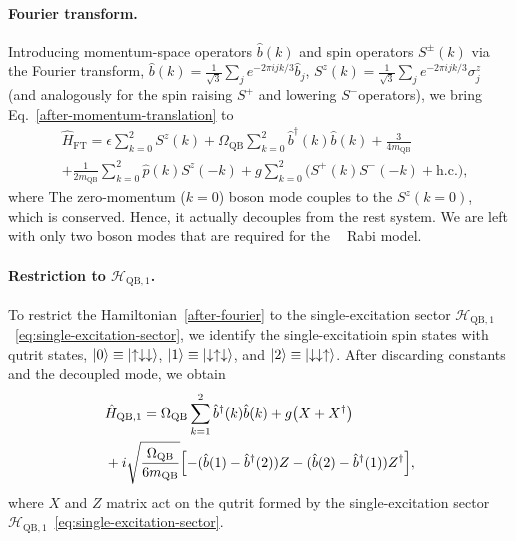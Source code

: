 \documentclass[reprint, aps, prx, amsmath, amssymb, longbibliography, superscriptaddress]{revtex4-2}
\DeclareMathOperator{\Zthree}{\mathbb{Z}_3}
\begin{document}
\paragraph{Fourier transform.}
Introducing momentum-space operators $\hat b(k)$ and spin operators $S^{\pm}(k)$ via the Fourier transform, $\hat b(k)= \tfrac{1}{\sqrt{3}}\sum_{j}e^{-2\pi i jk/3}\hat b_j$, $ S^z(k)= \tfrac{1}{\sqrt{3}}\sum_{j}e^{-2\pi i jk/3}\sigma_j^z$ (and analogously for the spin raising $S^+$ and lowering $S^-$operators), we
bring Eq.~\eqref{after-momentum-translation} to
\begin{equation}
\label{after-fourier}
  \begin{aligned}
    &\hat H_{\text{FT}} = \epsilon \sum_{k=0}^{2} S^{z}(k)
      + \Omega_{\text{QB}} \sum_{k=0}^{2} \hat b^{\dagger}(k) \hat b(k)
                         + \frac{3}{4 m_{\text{QB}}} \\
     &+\frac{1}{2 m_{\text{QB}}} \sum_{k=0}^{2} \hat p(k) S^{z}(-k)
            + g \sum_{k=0}^{2} \bigl( S^{+}(k) S^{-}(-k) + \text{h.c.} \bigr),
  \end{aligned}
\end{equation}
where The zero-momentum ($k=0$) boson mode
couples to the $S^z(k=0)$, which is conserved. Hence, it actually decouples from the rest system. We are left with only two boson modes that are required for the $\Zthree$ Rabi model.

\paragraph{Restriction to $\mathcal H_{\text{QB},1}$.}
To restrict the Hamiltonian~\eqref{after-fourier} to the single-excitation sector $\mathcal{H}_{\text{QB},1}$~\eqref{eq:single-excitation-sector}, we identify the single-excitatioin spin states with qutrit states, $\ket{0} \equiv \ket{\uparrow\downarrow\downarrow}$, $ \ket{1} \equiv \ket{\downarrow\uparrow\downarrow}$, and $ \ket{2} \equiv \ket{\downarrow\downarrow\uparrow} $. After discarding constants and the decoupled mode, we obtain
\begin{equation}
  \begin{aligned}
    &\hat H_{\text{QB},1} = \Omega_{\text{QB}} \sum_{k=1}^{2} \hat b^{\dagger}(k)
      \hat b(k) + g \bigl( X + X^{\dagger} \bigr)
      \\
      &+ i \sqrt{ \frac{\Omega_{\text{QB}}}{6 m_{\text{QB}}} }
        \Bigl[ -( \hat b(1) - \hat b^{\dagger}(2) ) Z
        - ( \hat b(2) - \hat b^{\dagger}(1) ) Z^{\dagger} \Bigr],
  \end{aligned}
\end{equation}
where $X$ and $Z$ matrix act on the qutrit formed by the single-excitation sector $\mathcal{H}_{\text{QB},1}$~\eqref{eq:single-excitation-sector}.
\end{document}
